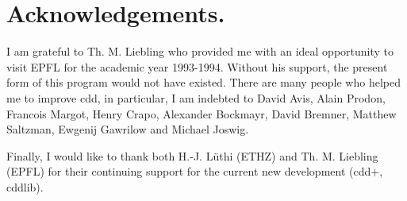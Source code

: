 \documentclass[11pt]{article}
\begin{document}
\section*{Acknowledgements.} 
I am  grateful to Th. M. Liebling who
provided me with an ideal opportunity to visit EPFL
for the academic year 1993-1994.  Without his 
support, the present form of this program would not have existed.
There are many people who helped me to improve cdd,  in particular,
I am indebted to David Avis, Alain Prodon,  Francois Margot, Henry Crapo,
Alexander Bockmayr, David Bremner, Matthew Saltzman, Ewgenij Gawrilow and
Michael Joswig.

Finally, I would like to thank both H.-J. L\"uthi (ETHZ)
 and Th. M. Liebling (EPFL) for their continuing support for 
the current new development (cdd+, cddlib).  




\end{document}
